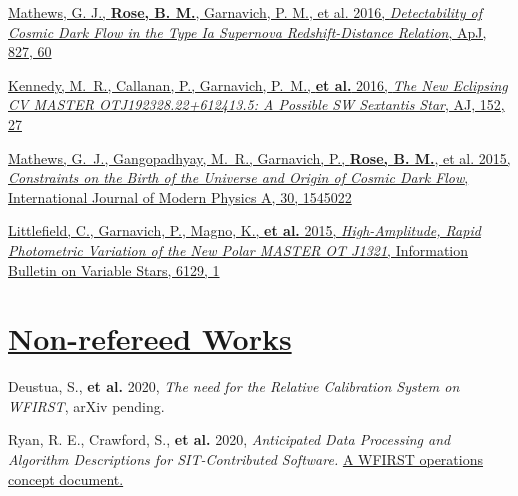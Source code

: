 \documentclass[margin]{res}
\begin{document}
\begin{resume}
\hangindent=15pt 
\href{https://ui.adsabs.harvard.edu/#abs/2016ApJ...827...60M/abstract}{Mathews, G. J., {\bf Rose, B. M.}, Garnavich, P. M., et al. 2016, {\sl Detectability of Cosmic Dark Flow in the Type Ia Supernova Redshift-Distance Relation}, ApJ, 827, 60}

\vspace{-12pt}
\hangindent=15pt 
\href{https://ui.adsabs.harvard.edu/#abs/2016AJ....152...27K/abstract}{Kennedy, M.~R., Callanan, P., Garnavich, P.~M., {\bf et al.} 2016, {\sl The New Eclipsing CV MASTER OTJ192328.22+612413.5: A Possible SW Sextantis Star}, AJ, 152, 27}

\vspace{-12pt}
\hangindent=15pt 
\href{https://ui.adsabs.harvard.edu/#abs/2015IJMPA..3045022M/abstract}{Mathews, G.~J., Gangopadhyay, M.~R., Garnavich, P., {\bf Rose, B. M.}, et al. 2015, {\sl Constraints on the Birth of the Universe and Origin of Cosmic Dark Flow}, International Journal of Modern Physics A, 30, 1545022}

\vspace{-12pt}
\hangindent=15pt 
\href{https://ui.adsabs.harvard.edu/#abs/2015IBVS.6129....1L/abstract}{Littlefield, C., Garnavich, P., Magno, K., {\bf et al.} 2015, {\sl High-Amplitude, Rapid Photometric Variation of the New Polar MASTER OT J1321}, Information Bulletin on Variable Stars, 6129, 1}



\section{\href{https://ui.adsabs.harvard.edu/\#search/q=orcid\%3A\%220000-0002-1873-8973\%22&sort=date\%20desc\%2C\%20bibcode\%20desc}{Non-refereed Works}}

\hangindent=15pt 
Deustua, S., \textbf{et al.} 2020, {\sl The need for the Relative Calibration System on WFIRST}, arXiv pending.
\vspace{-12pt}

\hangindent=15pt 
Ryan, R. E., Crawford, S., \textbf{et al.} 2020, {\sl Anticipated Data Processing and Algorithm Descriptions for SIT-Contributed Software.} \href{https://outerspace.stsci.edu/display/FWG/Anticipated+Data+Processing+and+Algorithm+Descriptions+for+SIT-Contributed+Software}{A WFIRST operations concept document.}
\vspace{-12pt}



\end{resume}
\end{document}
